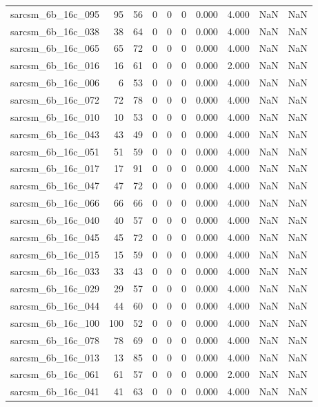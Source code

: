 \documentclass{article}
\begin{document}
\begin{longtable}{lrrrrrrrrr}
sarcsm\_6b\_16c\_095 & 95 & 56 & 0 & 0 & 0 & 0.000 & 4.000 & NaN & NaN \\
sarcsm\_6b\_16c\_038 & 38 & 64 & 0 & 0 & 0 & 0.000 & 4.000 & NaN & NaN \\
sarcsm\_6b\_16c\_065 & 65 & 72 & 0 & 0 & 0 & 0.000 & 4.000 & NaN & NaN \\
sarcsm\_6b\_16c\_016 & 16 & 61 & 0 & 0 & 0 & 0.000 & 2.000 & NaN & NaN \\
sarcsm\_6b\_16c\_006 & 6 & 53 & 0 & 0 & 0 & 0.000 & 4.000 & NaN & NaN \\
sarcsm\_6b\_16c\_072 & 72 & 78 & 0 & 0 & 0 & 0.000 & 4.000 & NaN & NaN \\
sarcsm\_6b\_16c\_010 & 10 & 53 & 0 & 0 & 0 & 0.000 & 4.000 & NaN & NaN \\
sarcsm\_6b\_16c\_043 & 43 & 49 & 0 & 0 & 0 & 0.000 & 4.000 & NaN & NaN \\
sarcsm\_6b\_16c\_051 & 51 & 59 & 0 & 0 & 0 & 0.000 & 4.000 & NaN & NaN \\
sarcsm\_6b\_16c\_017 & 17 & 91 & 0 & 0 & 0 & 0.000 & 4.000 & NaN & NaN \\
sarcsm\_6b\_16c\_047 & 47 & 72 & 0 & 0 & 0 & 0.000 & 4.000 & NaN & NaN \\
sarcsm\_6b\_16c\_066 & 66 & 66 & 0 & 0 & 0 & 0.000 & 4.000 & NaN & NaN \\
sarcsm\_6b\_16c\_040 & 40 & 57 & 0 & 0 & 0 & 0.000 & 4.000 & NaN & NaN \\
sarcsm\_6b\_16c\_045 & 45 & 72 & 0 & 0 & 0 & 0.000 & 4.000 & NaN & NaN \\
sarcsm\_6b\_16c\_015 & 15 & 59 & 0 & 0 & 0 & 0.000 & 4.000 & NaN & NaN \\
sarcsm\_6b\_16c\_033 & 33 & 43 & 0 & 0 & 0 & 0.000 & 4.000 & NaN & NaN \\
sarcsm\_6b\_16c\_029 & 29 & 57 & 0 & 0 & 0 & 0.000 & 4.000 & NaN & NaN \\
sarcsm\_6b\_16c\_044 & 44 & 60 & 0 & 0 & 0 & 0.000 & 4.000 & NaN & NaN \\
sarcsm\_6b\_16c\_100 & 100 & 52 & 0 & 0 & 0 & 0.000 & 4.000 & NaN & NaN \\
sarcsm\_6b\_16c\_078 & 78 & 69 & 0 & 0 & 0 & 0.000 & 4.000 & NaN & NaN \\
sarcsm\_6b\_16c\_013 & 13 & 85 & 0 & 0 & 0 & 0.000 & 4.000 & NaN & NaN \\
sarcsm\_6b\_16c\_061 & 61 & 57 & 0 & 0 & 0 & 0.000 & 2.000 & NaN & NaN \\
sarcsm\_6b\_16c\_041 & 41 & 63 & 0 & 0 & 0 & 0.000 & 4.000 & NaN & NaN \\

\end{longtable}
\end{document}
